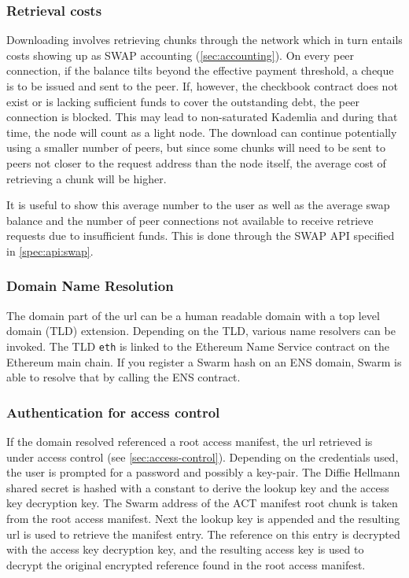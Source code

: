 \subsubsection{Retrieval costs}

Downloading involves retrieving chunks through the network which in turn entails costs showing up as SWAP accounting (\ref{sec:accounting}). On every peer connection, if the balance tilts beyond the effective payment threshold, a cheque is to be issued and sent to the peer. If, however, the checkbook contract does not exist or is lacking sufficient funds to cover the outstanding debt, the peer connection is blocked. This may lead to non-saturated Kademlia and during that time, the node will count as a light node. The download can continue potentially using a smaller number of peers, but since some chunks will need to be sent to peers not closer to the request address than the node itself, the average cost of retrieving a chunk will be higher. 

It is useful to show this average number to the user as well as the average swap balance and the number of peer connections not available to receive retrieve requests due to insufficient funds. This is done through the SWAP API specified in \ref{spec:api:swap}.




\subsubsection{Domain Name Resolution}

The domain part of the url can be a human readable domain with a top level domain (TLD) extension. Depending on the TLD, various name resolvers can be invoked. The TLD \texttt{eth} is linked to the Ethereum Name Service contract on the Ethereum main chain. If you register a Swarm hash on an ENS domain, Swarm is able to resolve that by calling the ENS contract. 

\subsubsection{Authentication for access control}

If the domain resolved referenced a root access manifest, the url retrieved is under access control (see \ref{sec:access-control}). 
Depending on the credentials used, the user is prompted for  a password and possibly a key-pair. 
The Diffie Hellmann shared secret is hashed with a constant to derive the lookup key and the access key decryption key. The Swarm address of the ACT manifest root chunk is taken from the root access manifest. 
Next the lookup key is appended and the resulting url is used to retrieve the manifest entry. The reference on this entry is decrypted with the access key decryption key, and the resulting access key is used to decrypt the original encrypted reference found in the root access manifest.

